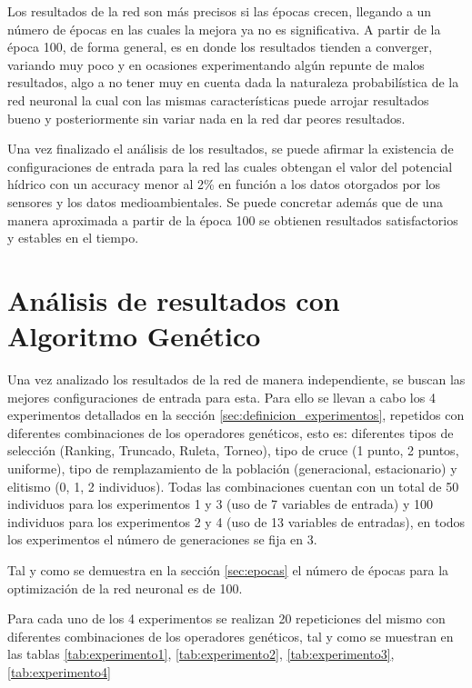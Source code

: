 Los resultados de la red son más precisos si las épocas crecen, llegando a un número de épocas en las cuales la mejora ya no es significativa. A partir de la época 100, de forma general, es en donde los resultados tienden a converger, variando muy poco y en ocasiones experimentando algún repunte de malos resultados, algo a no tener muy en cuenta dada la naturaleza probabilística de la red neuronal la cual con las mismas características puede arrojar resultados bueno y posteriormente sin variar nada en la red dar peores resultados.

Una vez finalizado el análisis de los resultados, se puede afirmar la existencia de  configuraciones de entrada para la red las cuales obtengan el valor del potencial hídrico con un accuracy menor al 2\% en función a los datos otorgados por los sensores y los datos medioambientales. Se puede concretar además que de una manera aproximada a partir de la época 100 se obtienen resultados satisfactorios y estables en el tiempo. 



\section{Análisis de resultados con Algoritmo Genético}

Una vez analizado los resultados de la red de manera independiente, se buscan las mejores configuraciones de entrada para esta. Para ello se llevan a cabo los 4 experimentos detallados en la sección \ref{sec:definicion_experimentos}, repetidos con diferentes combinaciones de los operadores genéticos, esto es: diferentes tipos de selección (Ranking, Truncado, Ruleta, Torneo), tipo de cruce (1 punto, 2 puntos, uniforme), tipo de remplazamiento de la población (generacional, estacionario) y elitismo (0, 1, 2 individuos). Todas las combinaciones cuentan con un total de 50 individuos para los experimentos 1 y 3 (uso de 7 variables de entrada) y 100 individuos para los experimentos 2 y 4 (uso de 13 variables de entradas), en todos los experimentos el número de generaciones se fija en 3.

Tal y como se demuestra en la sección \ref{sec:epocas} el número de épocas para la optimización de la red neuronal es de 100. 

Para cada uno de los 4 experimentos se realizan 20 repeticiones del mismo con diferentes combinaciones de los operadores genéticos, tal y como se muestran en las tablas \ref{tab:experimento1}, \ref{tab:experimento2}, \ref{tab:experimento3}, \ref{tab:experimento4}


